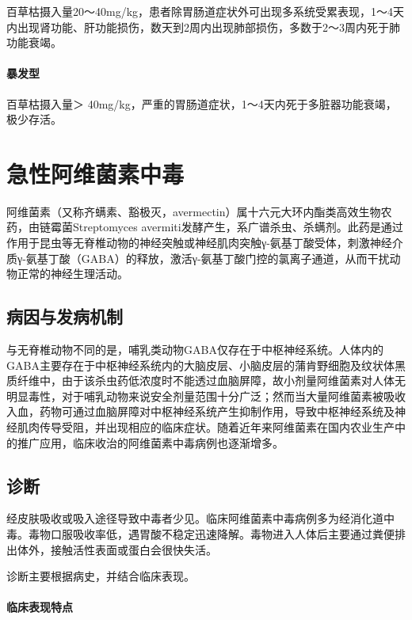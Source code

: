 百草枯摄入量20～40mg/kg，患者除胃肠道症状外可出现多系统受累表现，1～4天内出现肾功能、肝功能损伤，数天到2周内出现肺部损伤，多数于2～3周内死于肺功能衰竭。

\paragraph{暴发型}

百草枯摄入量＞
40mg/kg，严重的胃肠道症状，1～4天内死于多脏器功能衰竭，极少存活。

\protect\hypertarget{text00146.html}{}{}

\section{急性阿维菌素中毒}

阿维菌素（又称齐螨素、豁极灭，avermectin）属十六元大环内酯类高效生物农药，由链霉菌Streptomyces
avermiti发酵产生，系广谱杀虫、杀螨剂。此药是通过作用于昆虫等无脊椎动物的神经突触或神经肌肉突触γ-氨基丁酸受体，刺激神经介质γ-氨基丁酸（GABA）的释放，激活γ-氨基丁酸门控的氯离子通道，从而干扰动物正常的神经生理活动。

\subsection{病因与发病机制}

与无脊椎动物不同的是，哺乳类动物GABA仅存在于中枢神经系统。人体内的GABA主要存在于中枢神经系统内的大脑皮层、小脑皮层的蒲肯野细胞及纹状体黑质纤维中，由于该杀虫药低浓度时不能透过血脑屏障，故小剂量阿维菌素对人体无明显毒性，对于哺乳动物来说安全剂量范围十分广泛；然而当大量阿维菌素被吸收入血，药物可通过血脑屏障对中枢神经系统产生抑制作用，导致中枢神经系统及神经肌肉传导受阻，并出现相应的临床症状。随着近年来阿维菌素在国内农业生产中的推广应用，临床收治的阿维菌素中毒病例也逐渐增多。

\subsection{诊断}

经皮肤吸收或吸入途径导致中毒者少见。临床阿维菌素中毒病例多为经消化道中毒。毒物口服吸收率低，遇胃酸不稳定迅速降解。毒物进入人体后主要通过粪便排出体外，接触活性表面或蛋白会很快失活。

诊断主要根据病史，并结合临床表现。

\paragraph{临床表现特点}

